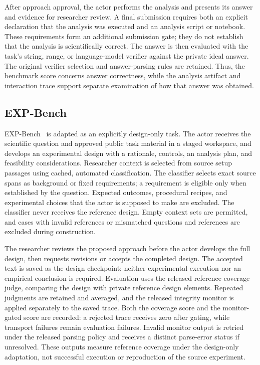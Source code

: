 After approach approval, the actor performs the analysis and presents its
answer and evidence for researcher review. A final submission requires both
an explicit declaration that the analysis was executed and an analysis script
or notebook. These requirements form an additional submission gate; they do
not establish that the analysis is scientifically correct. The answer is
then evaluated with the task's string, range, or language-model
verifier against the private ideal answer. The original verifier selection
and answer-parsing rules are retained. Thus, the benchmark score concerns
answer correctness, while the analysis artifact and interaction trace support
separate examination of how that answer was obtained.

\subsection{EXP-Bench}
\label{app:expbench}
EXP-Bench~\cite{kon2025expbench} is adapted as an explicitly design-only task.
The actor receives the scientific question and approved public task material
in a staged workspace, and develops an experimental design with a rationale,
controls, an analysis plan, and feasibility considerations. Researcher context
is selected from source setup passages using cached, automated classification.
The classifier selects exact source spans as background or fixed requirements;
a requirement is eligible only when established by the question. Expected
outcomes, procedural recipes, and experimental choices that the actor is
supposed to make are excluded. The classifier never receives the reference
design. Empty context sets are permitted, and cases with invalid references
or mismatched questions and references are excluded during construction.

The researcher reviews the proposed approach before the actor develops the
full design, then requests revisions or accepts the completed design. The
accepted text is saved as the design checkpoint; neither experimental
execution nor an empirical conclusion is required. Evaluation uses the
released reference-coverage judge, comparing the design with private
reference design elements. Repeated judgments are retained and averaged,
and the released integrity monitor is applied separately to the saved trace.
Both the coverage score and the monitor-gated score are recorded: a rejected
trace receives zero after gating, while transport failures remain evaluation
failures. Invalid monitor output is retried under the released parsing policy
and receives a distinct parse-error status if unresolved. These outputs
measure reference coverage under the design-only adaptation, not successful
execution or reproduction of the source experiment.

